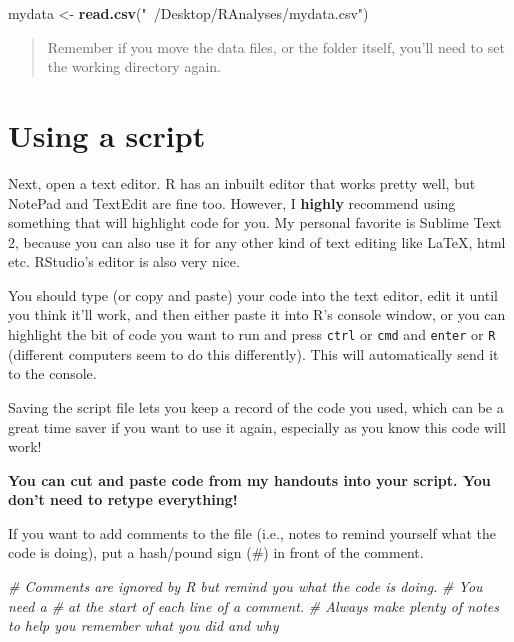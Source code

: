 \documentclass[]{book}
\newenvironment{Shaded}{\begin{snugshade}}{\end{snugshade}}
\newcommand{\KeywordTok}[1]{\textcolor[rgb]{0.13,0.29,0.53}{\textbf{{#1}}}}
\newcommand{\StringTok}[1]{\textcolor[rgb]{0.31,0.60,0.02}{{#1}}}
\newcommand{\CommentTok}[1]{\textcolor[rgb]{0.56,0.35,0.01}{\textit{{#1}}}}
\newcommand{\NormalTok}[1]{{#1}}
\theoremstyle{definition}
\theoremstyle{definition}
\theoremstyle{definition}
\theoremstyle{remark}
\begin{document}
\begin{Shaded}
\begin{Highlighting}[]
\NormalTok{mydata <-}\StringTok{ }\KeywordTok{read.csv}\NormalTok{(}\StringTok{"~/Desktop/RAnalyses/mydata.csv"}\NormalTok{)}
\end{Highlighting}
\end{Shaded}

\begin{quote}
Remember if you move the data files, or the folder itself, you'll need
to set the working directory again.
\end{quote}

\section{Using a script}\label{using-a-script}

Next, open a text editor. R has an inbuilt editor that works pretty
well, but NotePad and TextEdit are fine too. However, I \textbf{highly}
recommend using something that will highlight code for you. My personal
favorite is Sublime Text 2, because you can also use it for any other
kind of text editing like LaTeX, html etc. RStudio's editor is also very
nice.

You should type (or copy and paste) your code into the text editor, edit
it until you think it'll work, and then either paste it into R's console
window, or you can highlight the bit of code you want to run and press
\texttt{ctrl} or \texttt{cmd} and \texttt{enter} or \texttt{R}
(different computers seem to do this differently). This will
automatically send it to the console.

Saving the script file lets you keep a record of the code you used,
which can be a great time saver if you want to use it again, especially
as you know this code will work!

\textbf{You can cut and paste code from my handouts into your script.
You don't need to retype everything!}

If you want to add comments to the file (i.e., notes to remind yourself
what the code is doing), put a hash/pound sign (\#) in front of the
comment.

\begin{Shaded}
\begin{Highlighting}[]
\CommentTok{# Comments are ignored by R but remind you what the code is doing. }
\CommentTok{# You need a # at the start of each line of a comment.}
\CommentTok{# Always make plenty of notes to help you remember what you did and why}
\end{Highlighting}
\end{Shaded}
\end{document}
